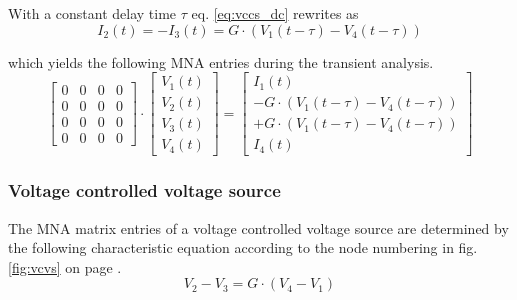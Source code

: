 With a constant delay time $\tau$ eq. \eqref{eq:vccs_dc} rewrites as
\begin{equation}
\label{eq:vccs_delay}
I_2\left(t\right) = -I_3\left(t\right) = G\cdot \left(V_1\left(t -\tau\right) - V_4\left(t -\tau\right)\right)
\end{equation}

which yields the following MNA entries during the transient analysis.
\begin{equation}
\begin{bmatrix}
0 & 0 & 0 & 0\\
0 & 0 & 0 & 0\\
0 & 0 & 0 & 0\\
0 & 0 & 0 & 0
\end{bmatrix}
\cdot
\begin{bmatrix}
V_1\left(t\right)\\
V_2\left(t\right)\\
V_3\left(t\right)\\
V_4\left(t\right)
\end{bmatrix}
=
\begin{bmatrix}
I_1\left(t\right)\\
-G\cdot\left(V_1\left(t -\tau\right) - V_4\left(t -\tau\right)\right)\\
+G\cdot\left(V_1\left(t -\tau\right) - V_4\left(t -\tau\right)\right)\\
I_4\left(t\right)
\end{bmatrix}
\end{equation}

\subsubsection{Voltage controlled voltage source}

The MNA matrix entries of a voltage controlled voltage source are
determined by the following characteristic equation according to the
node numbering in fig. \ref{fig:vcvs} on page \pageref{fig:vcvs}.
\begin{equation}
\label{eq:vcvs_dc}
V_2 - V_3 = G\cdot\left(V_4 - V_1\right)
\end{equation}

